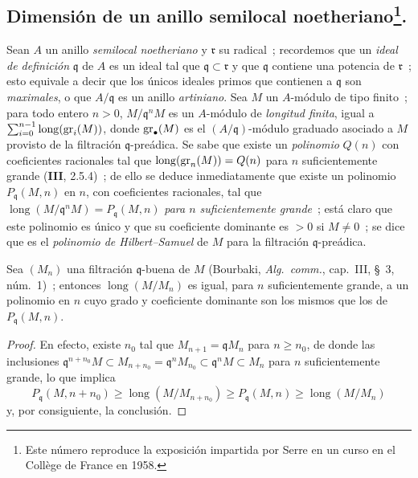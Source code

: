 \subsection[Dimensión de un anillo semilocal noetheriano]{Dimensión de un
anillo semilocal noetheriano\protect\footnote{Este número reproduce la exposición
impartida por Serre en un curso en el Collège de France en 1958.}.}
\label{subsection:0.16.2-fr}

\begin{env}[16.2.1]
\label{0.16.2.1-fr}
Sean $A$ un anillo \emph{semilocal noetheriano} y $\mathfrak{r}$ su radical~;
recordemos que un \emph{ideal de definición} $\mathfrak{q}$ de $A$ es un ideal tal que
$\mathfrak{q}\subset\mathfrak{r}$ y que $\mathfrak{q}$ contiene una potencia de
$\mathfrak{r}$~; esto equivale a decir que los únicos ideales primos que
contienen a $\mathfrak{q}$ son \emph{maximales}, o que $A/\mathfrak{q}$ es un anillo
\emph{artiniano}. Sea $M$ un $A$-módulo de tipo finito~; para todo entero $n>0$,
$M/\mathfrak{q}^nM$ es un $A$-módulo de \emph{longitud finita}, igual a
$\sum_{i=0}^{n- 1}\operatorname{long}(\operatorname{gr}_i(M))$, donde $\operatorname{gr}_\bullet(M)$ es el
$(A/\mathfrak{q})$-módulo graduado asociado a $M$ provisto de la filtración
$\mathfrak{q}$-preádica. Se sabe que existe un \emph{polinomio} $Q(n)$ con
coeficientes racionales tal que $\operatorname{long}(\operatorname{gr}_n(M))=Q(n)$ para $n$
suficientemente grande (\textbf{III}, 2.5.4)~; de ello se deduce inmediatamente que
existe un polinomio $P_{\mathfrak{q}}(M,n)$ en $n$, con coeficientes racionales,
tal que
$\operatorname{long}(M/\mathfrak{q}^nM)=P_{\mathfrak{q}}(M,n)$
\emph{para $n$ suficientemente grande}~; está claro que este polinomio es único y que
su coeficiente dominante es $>0$ si $M\neq0$~; se dice que es el \emph{polinomio de
Hilbert--Samuel} de $M$ para la filtración $\mathfrak{q}$-preádica.
\end{env}


\begin{lemma}[16.2.2.1]
\label{0.16.2.2.1-fr}

Sea $(M_n)$ una filtración $\mathfrak{q}$-buena de $M$ \textup{(Bourbaki,
\emph{Alg.~comm.}, cap.~III, \S~3, núm.~1)}~; entonces
$\operatorname{long}(M/M_n)$ es igual, para $n$ suficientemente grande, a un
polinomio en $n$ cuyo grado y coeficiente dominante son los mismos que los de
$P_{\mathfrak{q}}(M,n)$.
\end{lemma}

\begin{proof}
En efecto, existe $n_0$ tal que $M_{n+1}=\mathfrak{q}M_n$ para $n\geq n_0$,
de donde las inclusiones
$\mathfrak{q}^{n+n_0}M\subset M_{n+n_0}=\mathfrak{q}^nM_{n_0}
\subset\mathfrak{q}^nM\subset M_n$ para $n$ suficientemente grande, lo que
implica
\[
  P_{\mathfrak{q}}(M,n+n_0)\geq
  \operatorname{long}(M/M_{n+n_0})\geq
  P_{\mathfrak{q}}(M,n)\geq\operatorname{long}(M/M_n)
\]
y, por consiguiente, la conclusión.
\end{proof}

